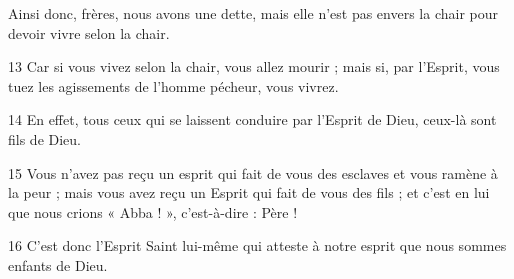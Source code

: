 Ainsi donc, frères, nous avons une dette, mais elle n’est pas envers la chair pour devoir vivre selon la chair.

13 Car si vous vivez selon la chair, vous allez mourir ; mais si, par l’Esprit, vous tuez les agissements de l’homme pécheur, vous vivrez.

14 En effet, tous ceux qui se laissent conduire par l’Esprit de Dieu, ceux-là sont fils de Dieu.

15 Vous n’avez pas reçu un esprit qui fait de vous des esclaves et vous ramène à la peur ; mais vous avez reçu un Esprit qui fait de vous des fils ; et c’est en lui que nous crions « Abba ! », c’est-à-dire : Père !

16 C’est donc l’Esprit Saint lui-même qui atteste à notre esprit que nous sommes enfants de Dieu.
